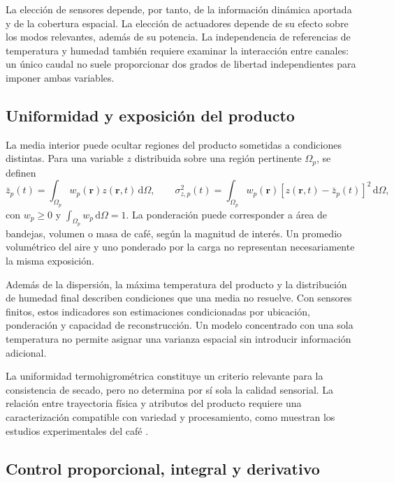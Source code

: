 La elección de sensores depende, por tanto, de la información dinámica aportada y de la cobertura espacial. La elección de actuadores depende de su efecto sobre los modos relevantes, además de su potencia. La independencia de referencias de temperatura y humedad también requiere examinar la interacción entre canales: un único caudal no suele proporcionar dos grados de libertad independientes para imponer ambas variables.

\subsection{Uniformidad y exposición del producto}
\label{subsec:uniformidad_desempeno}

La media interior puede ocultar regiones del producto sometidas a condiciones distintas. Para una variable $z$ distribuida sobre una región pertinente $\Omega_p$, se definen
\begin{equation}
\bar z_p(t)=\int_{\Omega_p}w_p(\mathbf r)z(\mathbf r,t)\,\mathrm{d}\Omega,
\qquad
\sigma_{z,p}^2(t)=\int_{\Omega_p}w_p(\mathbf r)
[z(\mathbf r,t)-\bar z_p(t)]^2\,\mathrm{d}\Omega,
\label{eq:uniformidad_ponderada}
\end{equation}
con $w_p\geq0$ y $\int_{\Omega_p}w_p\,\mathrm{d}\Omega=1$. La ponderación puede corresponder a área de bandejas, volumen o masa de café, según la magnitud de interés. Un promedio volumétrico del aire y uno ponderado por la carga no representan necesariamente la misma exposición.

Además de la dispersión, la máxima temperatura del producto y la distribución de humedad final describen condiciones que una media no resuelve. Con sensores finitos, estos indicadores son estimaciones condicionadas por ubicación, ponderación y capacidad de reconstrucción. Un modelo concentrado con una sola temperatura no permite asignar una varianza espacial sin introducir información adicional.

La uniformidad termohigrométrica constituye un criterio relevante para la consistencia de secado, pero no determina por sí sola la calidad sensorial. La relación entre trayectoria física y atributos del producto requiere una caracterización compatible con variedad y procesamiento, como muestran los estudios experimentales del café \cite{alves2017}.

\subsection{Control proporcional, integral y derivativo}
\label{subsec:control_clasico}


